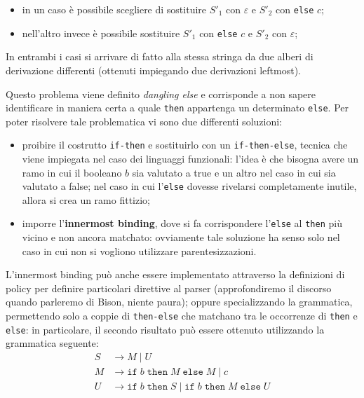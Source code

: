 \documentclass[class=book, crop=false, oneside, 12pt]{standalone}
\begin{document}
\begin{itemize}
	\item in un caso è possibile scegliere di sostituire \({S'}_1\) con \(\varepsilon\) e \({S'}_2\) con \texttt{else} \(c\);
	\item nell'altro invece è possibile sostituire \({S'}_1\) con \texttt{else} \(c\) e \({S'}_2\) con \(\varepsilon\);
\end{itemize}

In entrambi i casi si arrivare di fatto alla stessa stringa da due alberi di derivazione differenti (ottenuti impiegando due derivazioni leftmost).

Questo problema viene definito \emph{dangling else} e corrisponde a non sapere identificare in maniera certa a quale \texttt{then} appartenga un determinato \texttt{else}. Per poter risolvere tale problematica vi sono due differenti soluzioni:
\begin{itemize}
    \item proibire il costrutto \texttt{if-then} e sostituirlo con un \texttt{if-then-else}, tecnica che viene impiegata nel caso dei linguaggi funzionali: l'idea è che bisogna avere un ramo in cui il booleano \(b\) sia valutato a true e un altro nel caso in cui sia valutato a false; nel caso in cui l'\texttt{else} dovesse rivelarsi completamente inutile, allora si crea un ramo fittizio;
    \item imporre l'\textbf{innermost binding}, dove si fa corrispondere l'\texttt{else} al \texttt{then} più vicino e non ancora matchato: ovviamente tale soluzione ha senso solo nel caso in cui non si vogliono utilizzare parentesizzazioni.
\end{itemize}
L'innermost binding può anche essere implementato attraverso la definizioni di policy per definire particolari direttive al parser (approfondiremo il discorso quando parleremo di Bison, niente paura); oppure specializzando la grammatica, permettendo solo a coppie di \texttt{then-else} che matchano tra le occorrenze di \texttt{then} e \texttt{else}: in particolare, il secondo risultato può essere ottenuto utilizzando la grammatica seguente:
\begin{align*}
    S &\rightarrow M \mid U \\
    M &\rightarrow \texttt{if} \; b \; \texttt{then} \; M \; \texttt{else} \; M \mid c \\
    U &\rightarrow \texttt{if} \; b \; \texttt{then} \; S \mid \texttt{if} \; b \; \texttt{then} \; M \; \texttt{else} \; U
\end{align*}
\end{document}
